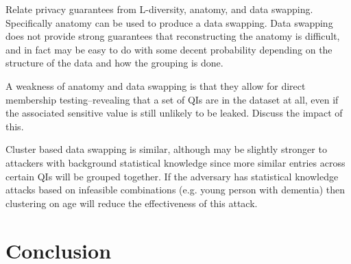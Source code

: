 Relate privacy guarantees from L-diversity, anatomy, and data swapping. Specifically anatomy can be used to produce a data swapping. Data swapping does not provide strong guarantees that reconstructing the anatomy is difficult, and in fact may be easy to do with some decent probability depending on the structure of the data and how the grouping is done.

A weakness of anatomy and data swapping is that they allow for direct membership testing--revealing that a set of QIs are in the dataset at all, even if the associated sensitive value is still unlikely to be leaked. Discuss the impact of this.

Cluster based data swapping is similar, although may be slightly stronger to attackers with background statistical knowledge since more similar entries across certain QIs will be grouped together. If the adversary has statistical knowledge attacks based on infeasible combinations (e.g. young person with dementia) then clustering on age will reduce the effectiveness of this attack.

\section{Conclusion}




% 





